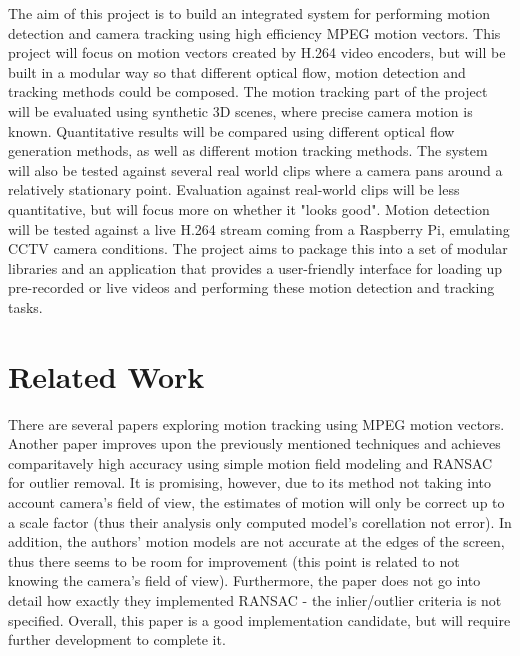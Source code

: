 \documentclass[11pt,english]{report}
\begin{document}
The aim of this project is to build an integrated system for performing motion detection and camera tracking using high efficiency MPEG motion vectors. This project will focus on motion vectors created by H.264 video encoders, but will be built in a modular way so that different optical flow, motion detection and tracking methods could be composed. The motion tracking part of the project will be evaluated using synthetic 3D scenes, where precise camera motion is known. Quantitative results will be compared using different optical flow generation methods, as well as different motion tracking methods. The system will also be tested against several real world clips where a camera pans around a relatively stationary point. Evaluation against real-world clips will be less quantitative, but will focus more on whether it "looks good". Motion detection will be tested against a live H.264 stream coming from a Raspberry Pi, emulating CCTV camera conditions. The project aims to package this into a set of modular libraries and an application that provides a user-friendly interface for loading up pre-recorded or live videos and performing these motion detection and tracking tasks.

\section{Related Work}

There are several papers exploring motion tracking using MPEG motion vectors\cite{1334181}\cite{1414440}\cite{825867}. Another paper improves upon the previously mentioned techniques and achieves comparitavely high accuracy using simple motion field modeling and RANSAC for outlier removal\cite{almeida}. It is promising, however, due to its method not taking into account camera's field of view, the estimates of motion will only be correct up to a scale factor (thus their analysis only computed model's corellation not error). In addition, the authors' motion models are not accurate at the edges of the screen, thus there seems to be room for improvement (this point is related to not knowing the camera's field of view). Furthermore, the paper does not go into detail how exactly they implemented RANSAC - the inlier/outlier criteria is not specified. Overall, this paper is a good implementation candidate, but will require further development to complete it.
\end{document}
